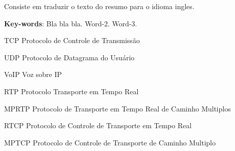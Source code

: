 \documentclass[
	12pt,				%
	openright,			%
	oneside,			%
	a4paper,			%
	chapter=TITLE,		%
	english,			%
	brazil,				%
	]{abntex2}
\renewcommand{\ABNTEXchapterfont}{\normalfont}
\begin{document}
\begin{resumo}[Abstract]
\ABNTEXchapterfont
Consiste em traduzir o texto do resumo para o idioma ingles.


\textbf{Key-words}: Bla bla bla. Word-2. Word-3.
\end{resumo}


\listoffigures*
\cleardoublepage


\listoftables*
\cleardoublepage


\begin{siglas}
\ABNTEXchapterfont\item[TCP] Protocolo de Controle de Transmissão
\item[UDP] Protocolo de Datagrama do Usuário 
\item[VoIP] Voz sobre IP 
\item[RTP] Protocolo Transporte em Tempo Real
\item[MPRTP] Protocolo de Transporte em Tempo Real de Caminho Multiplos \item[RTCP] Protocolo de Controle de Transporte em Tempo Real
\item[MPTCP] Protocolo de Controle de Transporte de Caminho Multiplo 
\end{siglas}
\tableofcontents*
\cleardoublepage
\textual
\end{document}
